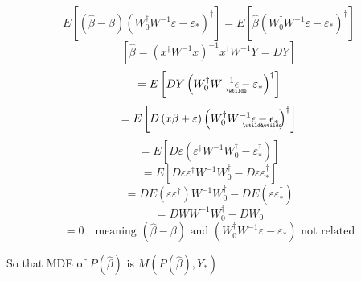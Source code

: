 \documentclass{article}
\begin{document}
\begin{equation*}
E\left[ \left( \hat{\beta}-\beta \right) \left( W_{0}^{\dagger
}W^{-1}\varepsilon -\varepsilon _{\ast }\right) ^{\dagger }\right] =E\left[ 
\hat{\beta}\left( W_{0}^{\dagger }W^{-1}\varepsilon -\varepsilon _{\ast
}\right) ^{\dagger }\right]
\end{equation*}%
\begin{equation*}
\left[ \hat{\beta}=\left( x^{\dagger }W^{-1}x\right) ^{-1}x^{\dagger
}W^{-1}Y=DY\right]
\end{equation*}%
\begin{equation*}
=E\left[ DY\left( W_{0}^{\dagger }W^{-1}%
\underaccent{\wtilde}{\epsilon}%
-\varepsilon _{\ast }\right) ^{\dagger }\right]
\end{equation*}%
\begin{equation*}
=E\left[ D\left( x\beta +\varepsilon \right) \left( W_{0}^{\dagger }W^{-1}%
\underaccent{\wtilde}{\epsilon}%
-%
\underaccent{\wtilde}{\epsilon}%
_{\ast }\right) ^{\dagger }\right]
\end{equation*}%
\begin{equation*}
=E\left[ D\varepsilon \left( \varepsilon ^{\dagger }W^{-1}W_{0}^{\dagger
}-\varepsilon _{\ast }^{\dagger }\right) \right]
\end{equation*}%
\begin{equation*}
=E\left[ D\varepsilon \varepsilon ^{\dagger }W^{-1}W_{0}^{\dagger
}-D\varepsilon \varepsilon _{\ast }^{\dagger }\right]
\end{equation*}%
\begin{equation*}
=DE\left( \varepsilon \varepsilon ^{\dagger }\right) W^{-1}W_{0}^{\dagger
}-DE\left( \varepsilon \varepsilon _{\ast }^{\dagger }\right)
\end{equation*}%
\begin{equation*}
=DWW^{-1}W_{0}^{\dagger }-DW_{0}
\end{equation*}%
\begin{equation*}
=0\quad \text{meaning }\left( \hat{\beta}-\beta \right) \text{ and }\left(
W_{0}^{\dagger }W^{-1}\varepsilon -\varepsilon _{\ast }\right) \text{ not
related}
\end{equation*}

So that MDE of $P\left( \hat{\beta}\right) $ is $M\left( P\left( \hat{\beta}%
\right) ,Y_{\ast }\right) $
\end{document}

